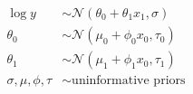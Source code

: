 \documentclass[varwidth=\linewidth]{standalone}
\begin{document}
$$\begin{aligned}
\log y &\sim \mathcal{N}(\theta_0 + \theta_1 x_1, \sigma) \\
\theta_0 &\sim \mathcal{N}(\mu_0 + \phi_0 x_0, \tau_0) \\
\theta_1 &\sim \mathcal{N}(\mu_1 + \phi_1 x_0, \tau_1) \\
\sigma, \mu, \phi, \tau &\sim \textrm{uninformative priors} \\
\end{aligned}$$
\end{document}
